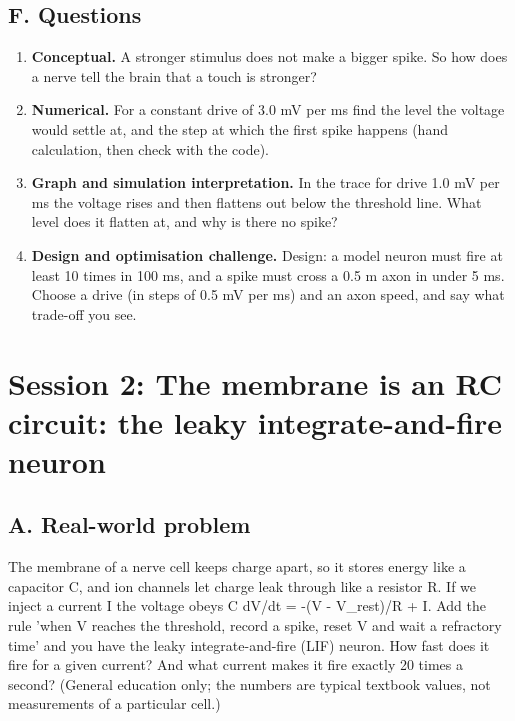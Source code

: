 \documentclass[11pt,a4paper]{article}
\begin{document}
\subsection*{F. Questions}
\begin{enumerate}[nosep]
\item \textbf{Conceptual.} A stronger stimulus does not make a bigger spike. So how does a nerve tell the brain that a touch is stronger?
\item \textbf{Numerical.} For a constant drive of 3.0 mV per ms find the level the voltage would settle at, and the step at which the first spike happens (hand calculation, then check with the code).
\item \textbf{Graph and simulation interpretation.} In the trace for drive 1.0 mV per ms the voltage rises and then flattens out below the threshold line. What level does it flatten at, and why is there no spike?
\item \textbf{Design and optimisation challenge.} Design: a model neuron must fire at least 10 times in 100 ms, and a spike must cross a 0.5 m axon in under 5 ms. Choose a drive (in steps of 0.5 mV per ms) and an axon speed, and say what trade-off you see.
\end{enumerate}

\section{Session 2: The membrane is an RC circuit: the leaky integrate-and-fire neuron}

\subsection*{A. Real-world problem}
The membrane of a nerve cell keeps charge apart, so it stores energy like a capacitor C, and ion channels let charge leak through like a resistor R. If we inject a current I the voltage obeys C dV/dt = -(V - V\_rest)/R + I. Add the rule 'when V reaches the threshold, record a spike, reset V and wait a refractory time' and you have the leaky integrate-and-fire (LIF) neuron. How fast does it fire for a given current? And what current makes it fire exactly 20 times a second? (General education only; the numbers are typical textbook values, not measurements of a particular cell.)
\end{document}
